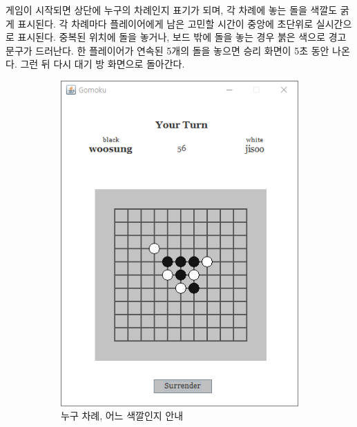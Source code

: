 \documentclass[a4paper, 10pt]{article}
\begin{document}
게임이 시작되면 상단에 누구의 차례인지 표기가 되며, 각 차례에 놓는 돌을
색깔도 굵게 표시된다. 각 차례마다 플레이어에게 남은 고민할 시간이 중앙에
초단위로 실시간으로 표시된다. 중복된 위치에 돌을 놓거나, 보드 밖에 돌을
놓는 경우 붉은 색으로 경고 문구가 드러난다. 한 플레이어가 연속된 5개의
돌을 놓으면 승리 화면이 5초 동안 나온다. 그런 뒤 다시 대기 방 화면으로 돌아간다.
\begin{figure}[h]
  \centering
  \begin{subfigure}{.3\textwidth}
    \centering
    \includegraphics[width=.8\linewidth]{resource/game}
    \caption{누구 차례, 어느 색깔인지 안내}
    \label{fig:waiting}
  \end{subfigure}
  \begin{subfigure}{.3\textwidth}
    \centering

\end{subfigure}
\end{figure}
\end{document}

